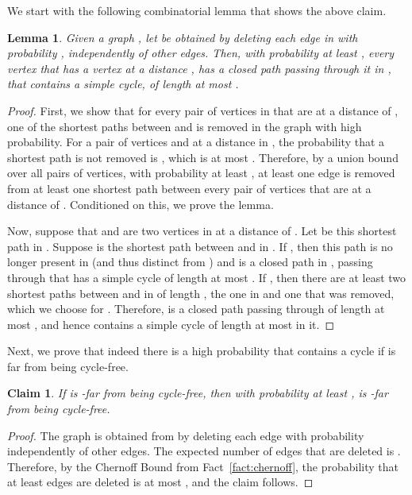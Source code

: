 \documentclass[11pt]{article}
\newtheorem{lemma}[theorem]{Lemma}
\newtheorem{claim}[theorem]{Claim}
\begin{document}
We start with the following combinatorial lemma that shows the above claim.


\begin{lemma}
  Given a graph , let  be obtained by deleting each edge in  with probability
  , independently of other edges. Then, with probability at least , every vertex  that has a vertex  at a distance , has a closed path passing
  through it in , that contains a simple cycle, of length at most .
  \label{lem:main}
\end{lemma}

\begin{proof}
  First, we show that for every pair  of vertices in  that are at a distance of , one of the shortest paths between  and  is removed in the graph  with high
  probability. For a pair of vertices  and  at a distance  in , the probability that a
  shortest path is not removed is , which is at most . Therefore, by a union
  bound over all pairs of vertices, with probability at least , at least one edge is
  removed from at least one shortest path between every pair of vertices that are at a distance of
  . Conditioned on this, we prove the lemma.

  Now, suppose that  and  are two vertices in  at a distance of . Let
   be this shortest path in . Suppose  is the shortest path between  and  in .
  If , then this path is no longer present in  (and thus distinct from
  ) and  is a closed path in , passing through  that has a simple cycle of
  length at most . If , then there are at least two
  shortest paths between  and  in  of length , the one in  and one
  that was removed, which we choose for . Therefore,  is a closed path passing through
   of length at most , and hence contains a simple cycle of length at most
   in it.
\end{proof}

Next, we prove that indeed there is a high probability that  contains a cycle if  is far from being cycle-free.
\begin{claim}
  If  is -far from being cycle-free, then with probability at least ,  is -far from being cycle-free.
  \label{obs:distance}
\end{claim}
\begin{proof}
  The graph  is obtained from  by deleting each edge with probability 
  independently of other edges. The expected number of edges that are deleted is .
  Therefore, by the Chernoff Bound from Fact~\ref{fact:chernoff}, the probability that at least  edges are
  deleted is at most , and the claim follows.
\end{proof}
\end{document}
